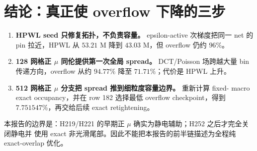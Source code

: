 \documentclass[UTF8,11pt,a4paper]{ctexart}
\begin{document}
\section{结论：真正使 overflow 下降的三步}

\begin{enumerate}[leftmargin=2.1em,itemsep=0.15em]
  \item \textbf{HPWL seed 只修复拓扑，不负责容量。} epsilon-active 次梯度把同一 net
        的 pin 拉近，HPWL 从 $53.21$ M 降到 $43.03$ M，但 overflow 仍约 $96\%$。
  \item \textbf{128 网格正 $\mu$ 同伦提供第一次全局 spread。} DCT/Poisson 场跨越大量
        bin 传递方向，overflow 从约 $94.77\%$ 降至 $71.71\%$；代价是 HPWL 上升。
  \item \textbf{512 网格正 $\mu$ 分支把 spread 推到细粒度容量边界。} 重新计算 fixed-
        macro exact occupancy，并在 row 182 选择最低 overflow checkpoint，得到
        $7.751547\%$，再交给后续 exact retightening。
\end{enumerate}

本报告的边界是：H219/H221 的早期正 $\mu$ 确实为静电辅助；H252 之后才完全关闭静电并
使用 exact 非光滑尾部。因此不能把本报告的前半链描述为全程纯 exact-overlap 优化。
\end{document}
